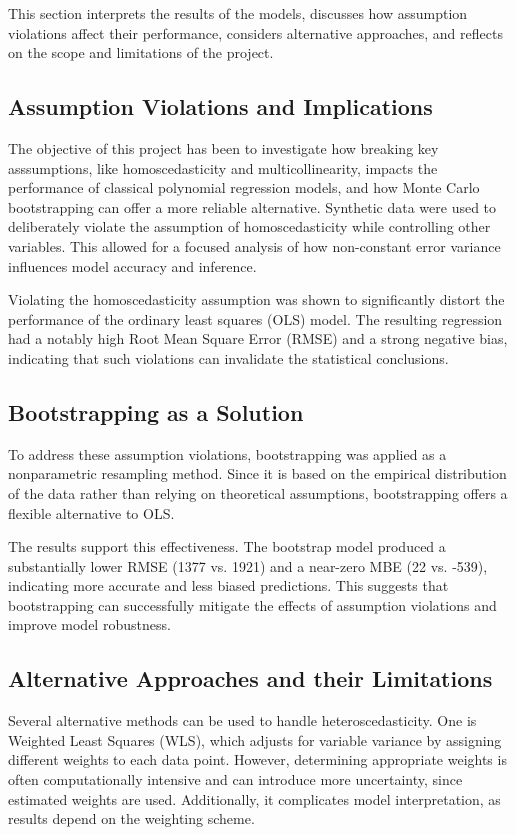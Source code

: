 This section interprets the results of the models, discusses how assumption violations affect their performance, considers alternative approaches, and reflects on the scope and limitations of the project.

\subsection{Assumption Violations and Implications}
The objective of this project has been to investigate how breaking key asssumptions, like homoscedasticity and multicollinearity, impacts the performance of classical polynomial regression models, and how Monte Carlo bootstrapping can offer a more reliable alternative. Synthetic data were used to deliberately violate the assumption of homoscedasticity while controlling other variables. This allowed for a focused analysis of how non-constant error variance influences model accuracy and inference.

\noindent Violating the homoscedasticity assumption was shown to significantly distort the performance of the ordinary least squares (OLS) model. The resulting regression had a notably high Root Mean Square Error (RMSE) and a strong negative bias, indicating that such violations can invalidate the statistical conclusions. 

\subsection{Bootstrapping as a Solution}
To address these assumption violations, bootstrapping was applied as a nonparametric resampling method. Since it is based on the empirical distribution of the data rather than relying on theoretical assumptions, bootstrapping offers a flexible alternative to OLS.

\noindent The results support this effectiveness. The bootstrap model produced a substantially lower RMSE (1377 vs. 1921) and a near-zero MBE (22 vs. -539), indicating more accurate and less biased predictions. This suggests that bootstrapping can successfully mitigate the effects of assumption violations and improve model robustness.

\subsection{Alternative Approaches and their Limitations}
Several alternative methods can be used to handle heteroscedasticity. One is Weighted Least Squares (WLS), which adjusts for variable variance by assigning different weights to each data point. However, determining appropriate weights is often computationally intensive and can introduce more uncertainty, since estimated weights are used. Additionally, it complicates model interpretation, as results depend on the weighting scheme.

